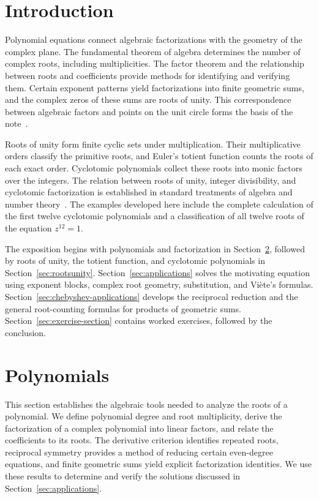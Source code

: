 \documentclass[11pt,a4paper]{article}
\numberwithin{equation}{section}
\theoremstyle{uprightpaper}
\begin{document}
\section{Introduction}\label{sec:intro}

Polynomial equations connect algebraic factorizations with the geometry of the complex plane. The fundamental theorem of algebra determines the number of complex roots, including multiplicities. The factor theorem and the relationship between roots and coefficients provide methods for identifying and verifying them. Certain exponent patterns yield factorizations into finite geometric sums, and the complex zeros of these sums are roots of unity. This correspondence between algebraic factors and points on the unit circle forms the basis of the note~\cite{barbeau1989,andreescu2014,needham1997}.

Roots of unity form finite cyclic sets under multiplication. Their multiplicative orders classify the primitive roots, and Euler's totient function counts the roots of each exact order. Cyclotomic polynomials collect these roots into monic factors over the integers. The relation between roots of unity, integer divisibility, and cyclotomic factorization is established in standard treatments of algebra and number theory~\cite{dummit2004,hardywright2008,irelandrosen1990,washington1997}. The examples developed here include the complete calculation of the first twelve cyclotomic polynomials and a classification of all twelve roots of the equation $z^{12}=1$.

The exposition begins with polynomials and factorization in Section~\ref{sec:polytheory}, followed by roots of unity, the totient function, and cyclotomic polynomials in Section~\ref{sec:rootsunity}. Section~\ref{sec:applications} solves the motivating equation using exponent blocks, complex root geometry, substitution, and Vi\`ete's formulas. Section~\ref{sec:chebyshev-applications} develops the reciprocal reduction and the general root-counting formulas for products of geometric sums. Section~\ref{sec:exercise-section} contains worked exercises, followed by the conclusion.

\section{Polynomials}\label{sec:polytheory}

This section establishes the algebraic tools needed to analyze the roots of a polynomial. We define polynomial degree and root multiplicity, derive the factorization of a complex polynomial into linear factors, and relate the coefficients to its roots. The derivative criterion identifies repeated roots, reciprocal symmetry provides a method of reducing certain even-degree equations, and finite geometric sums yield explicit factorization identities. We use these results to determine and verify the solutions discussed in Section~\ref{sec:applications}.
\end{document}
